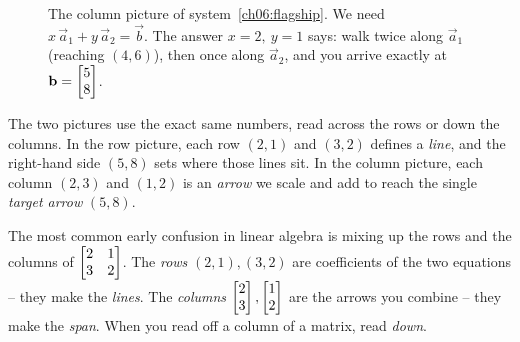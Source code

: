 \begin{figure}[H]
\centering
{}
\caption{The column picture of system~\eqref{ch06:flagship}. We need
$x\,\vec a_1 + y\,\vec a_2 = \vec b$. The answer $x=2,\ y=1$ says: walk twice
along $\vec a_1$ (reaching $(4,6)$), then once along $\vec a_2$, and you arrive exactly at
$\mathbf{b}=\begin{bmatrix}5\\8\end{bmatrix}$.}
\label{ch06:colpic}
\end{figure}

The two pictures use the exact same numbers, read across the rows or down the
columns. In the row picture, each row $(2,1)$ and $(3,2)$ defines a \emph{line},
and the right-hand side $(5,8)$ sets where those lines sit. In the column
picture, each column $(2,3)$ and $(1,2)$ is an \emph{arrow} we scale and add
to reach the single \emph{target arrow} $(5,8)$.

\begin{trapbox}
The most common early confusion in linear algebra is mixing up the rows and
the columns of $\begin{bmatrix}2 & 1\\3 & 2\end{bmatrix}$. The \emph{rows}
$(2,1),(3,2)$ are coefficients of the two equations -- they make the
\emph{lines}. The \emph{columns} $\begin{bmatrix}2\\3\end{bmatrix},\begin{bmatrix}1\\2\end{bmatrix}$ are the
arrows you combine -- they make the \emph{span}. When you read off a column
of a matrix, read \emph{down}.
\end{trapbox}

